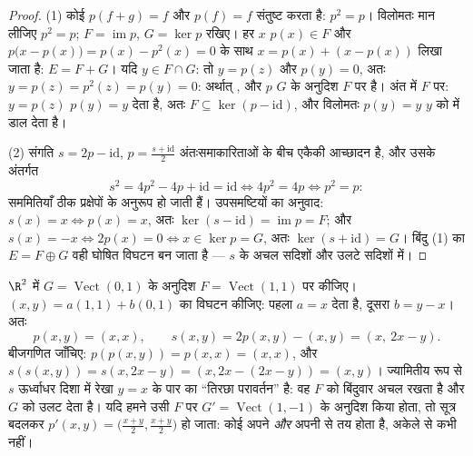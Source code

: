 \begin{proof}
(1) कोई  $p(f + g) = f$ और $p(f) = f$ संतुष्ट करता है: $p^2 = p$।
विलोमतः मान लीजिए $p^2 = p$; $F = \operatorname{im} p$, $G = \ker p$ रखिए।
हर $x$ $p(x) \in F$ और $p\bigl(x - p(x)\bigr) = p(x) - p^2(x) = 0$ के साथ $x
= p(x) + (x - p(x))$ लिखा जाता है: $E = F + G$। यदि $y \in F \cap G$: तो $y
= p(z)$ और $p(y) = 0$, अतः $y = p(z) = p^2(z) = p(y) = 0$: अर्थात् , और $p$ $G$ के अनुदिश $F$ पर  है। अंत में $F$ पर: $y = p(z)$
$p(y) = y$ देता है, अतः $F \subseteq \ker(p - \mathrm{id})$, और विलोमतः
$p(y) = y$ $y$ को  में डाल देता है।

(2) संगति $s = 2p - \mathrm{id}$, $p = \frac{s + \mathrm{id}}2$
अंतःसमाकारिताओं के बीच एकैकी आच्छादन है, और उसके अंतर्गत
\[
s^2 = 4p^2 - 4p + \mathrm{id} = \mathrm{id}
\iff 4p^2 = 4p \iff p^2 = p :
\]
सममितियाँ ठीक प्रक्षेपों के अनुरूप हो जाती हैं। उपसमष्टियों का अनुवाद: $s(x)
= x \iff p(x) = x$, अतः $\ker(s - \mathrm{id}) = \operatorname{im} p = F$;
और $s(x) = -x \iff 2p(x) = 0 \iff x \in \ker p = G$, अतः $\ker(s +
\mathrm{id}) = G$। बिंदु (1) का  $E = F \oplus G$ वही घोषित
विघटन बन जाता है --- $s$ के अचल सदिशों और उलटे सदिशों में।
\end{proof}

\begin{example}
\label{ex:b1:linmaps:projexplicit}
$\R^2$ में $G = \operatorname{Vect}(0,1)$ के अनुदिश $F =
\operatorname{Vect}(1,1)$ पर  कीजिए। $(x, y) = a(1,1) + b(0,1)$ का
विघटन कीजिए: पहला  $a = x$ देता है, दूसरा $b = y - x$। अतः
\[
p(x, y) = (x, x),
\qquad
s(x, y) = 2p(x,y) - (x,y) = (x,\ 2x - y).
\]
बीजगणित जाँचिए: $p(p(x,y)) = p(x,x) = (x,x)$, और $s(s(x,y)) = s(x, 2x - y) =
(x, 2x - (2x - y)) = (x, y)$। ज्यामितीय रूप से $s$ ऊर्ध्वाधर दिशा में रेखा
$y = x$ के पार का ``तिरछा परावर्तन'' है: वह $F$ को बिंदुवार अचल रखता है और
$G$ को उलट देता है। यदि हमने उसी $F$ पर $G' = \operatorname{Vect}(1,-1)$ के
अनुदिश  किया होता, तो सूत्र बदलकर $p'(x,y) = \bigl(\frac{x+y}2,
\frac{x+y}2\bigr)$ हो जाता: कोई  अपने  \emph{और} अपनी 
से तय होता है, अकेले  से कभी नहीं।
\end{example}

